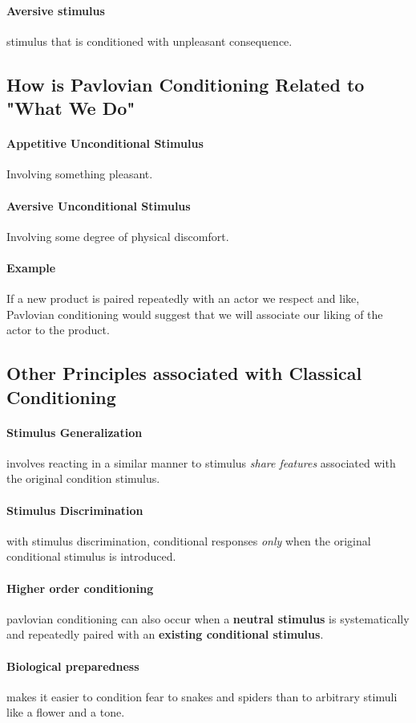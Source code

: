 \documentclass{article}
\begin{document}
	\paragraph{Aversive stimulus} stimulus that is conditioned with unpleasant consequence.
	\subsection{How is Pavlovian Conditioning Related to "What We Do"}
	\paragraph{Appetitive Unconditional Stimulus} Involving something pleasant.
	\paragraph{Aversive Unconditional Stimulus} Involving some degree of physical discomfort.
	\paragraph{Example} If a new product is paired repeatedly with an actor we respect and like, Pavlovian conditioning would suggest that we will associate our liking of the actor to the product.
	\subsection{Other Principles associated with Classical Conditioning}
	\paragraph{Stimulus Generalization} involves reacting in a similar manner to stimulus \emph{share features} associated with the original condition stimulus.
	\paragraph{Stimulus Discrimination} with stimulus discrimination, conditional responses \emph{only} when the original conditional stimulus is introduced. 
	\paragraph{Higher order conditioning} pavlovian conditioning can also occur when a \textbf{neutral stimulus} is systematically and repeatedly paired with an \textbf{existing conditional stimulus}.
	\paragraph{Biological preparedness} makes it easier to condition fear to snakes and spiders than to arbitrary stimuli like a flower and a tone.
	
\end{document}

